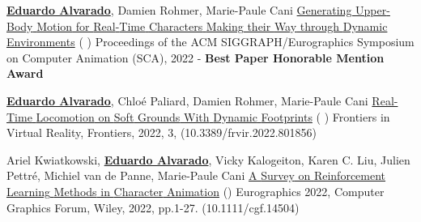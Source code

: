 

\begin{cventries}

\cvpublication
    {\textbf{\underline{Eduardo Alvarado}}, Damien Rohmer, Marie-Paule Cani} %
    {\href{https://edualvarado.com/generating-upper-body-motion/} {Generating {Upper}-{Body} {Motion} for {Real}-{Time} {Characters} {Making} their {Way} through {Dynamic} {Environments}} (\href{https://github.com/edualvarado/unity-antagonistic-controller}{} \href{https://hal.inria.fr/hal-03757439v1}{} \href{https://www.youtube.com/watch?v=dq4FJH1atWM}{})} %
    {Proceedings of the ACM SIGGRAPH/Eurographics Symposium on Computer Animation (SCA), 2022 - \textbf{Best Paper Honorable Mention Award}} %
    
\cvpublication
    {\textbf{\underline{Eduardo Alvarado}}, Chloé Paliard, Damien Rohmer, Marie-Paule Cani} %
    {\href{https://edualvarado.com/soft-grounds/}{Real-{Time} {Locomotion} on {Soft} {Grounds} {With} {Dynamic} {Footprints}} (\href{https://github.com/edualvarado/unity-footprints}{} \href{https://hal.inria.fr/hal-03630136}{} \href{https://youtu.be/aWBntnCOwEE}{})} %
    {Frontiers in Virtual Reality, Frontiers, 2022, 3, (10.3389/frvir.2022.801856)} %

\cvpublication
    {Ariel Kwiatkowski, \textbf{\underline{Eduardo Alvarado}}, Vicky Kalogeiton, Karen C. Liu, Julien Pettr{\'{e}}, Michiel van de Panne, Marie-Paule Cani} %
    {\href{https://edualvarado.com/reinforcement-learning-methods-in-character-animation/}{A {Survey} on {Reinforcement} {Learning} {Methods} in {Character} {Animation}} (\href{https://hal.inria.fr/hal-03600947}{})} %
    {Eurographics 2022, Computer Graphics Forum, Wiley, 2022, pp.1-27. (10.1111/cgf.14504)} %


\end{cventries}
